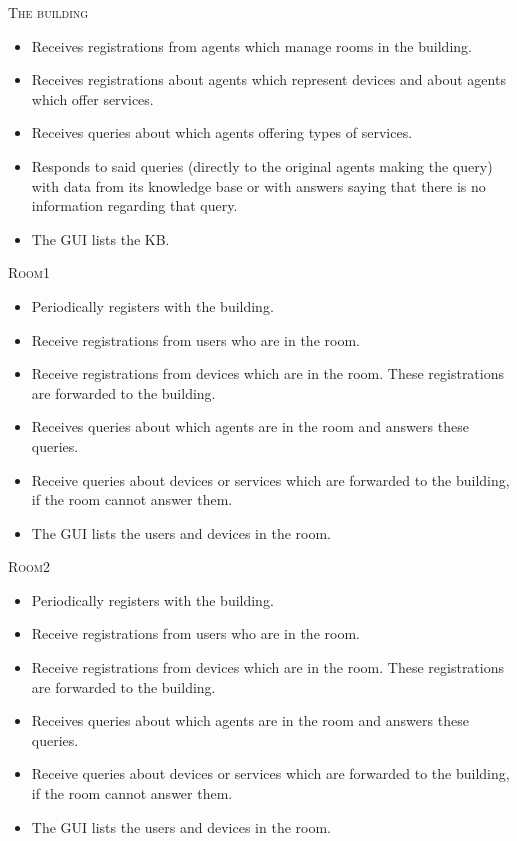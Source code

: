 \documentclass[a4paper, 12pt, twoside]{article}
\begin{document}

\textsc{The building}
\begin{itemize}
	\item Receives registrations from agents which manage rooms in the building.
	\item Receives registrations about agents which represent devices and about agents which offer services.
	\item Receives queries about which agents offering types of services.
	\item Responds to said queries (directly to the original agents making the query) with data from its knowledge base or with answers saying that there is no information regarding that query.
	\item The GUI lists the KB.
\end{itemize}


\textsc{Room1}
\begin{itemize}
	\item Periodically registers with the building.
	\item Receive registrations from users who are in the room.
	\item Receive registrations from devices which are in the room. These registrations are forwarded to the building.
	\item Receives queries about which agents are in the room and answers these queries.
	\item Receive queries about devices or services which are forwarded to the building, if the room cannot answer them.
	\item The GUI lists the users and devices in the room.
\end{itemize}


\textsc{Room2}
\begin{itemize}
	\item Periodically registers with the building.
	\item Receive registrations from users who are in the room.
	\item Receive registrations from devices which are in the room. These registrations are forwarded to the building.
	\item Receives queries about which agents are in the room and answers these queries.
	\item Receive queries about devices or services which are forwarded to the building, if the room cannot answer them.
	\item The GUI lists the users and devices in the room.
\end{itemize}
\end{document}
